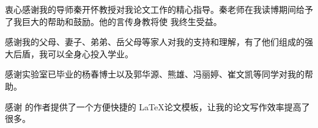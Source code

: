 \begin{acknowledgement}
  衷心感谢我的导师秦开怀教授对我论文工作的精心指导。秦老师在我读博期间给予了我巨大的帮助和鼓励。他的言传身教将使
  我终生受益。\par
  感谢我的父母、妻子、弟弟、岳父母等家人对我的支持和理解，有了他们组成的强大后盾，我可以全身心投入学业。\par
  感谢实验室已毕业的杨春博士以及郭华源、熊雄、冯丽婷、崔文凯等同学对我的帮助。\par 

  感谢 \thuthesis 的作者提供了一个方便快捷的 \LaTeX 论文模板，让我的论文写作效率提高了很多。
\end{acknowledgement}
